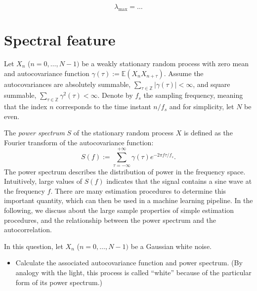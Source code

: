 \documentclass[11pt]{article}
\begin{document}
\begin{solution}  %

\begin{equation}
    \lambda_{\max} = \dots
\end{equation}

\end{solution}

\section{Spectral feature}

Let $X_n$ ($n=0,\dots,N-1)$ be a weakly stationary random process with zero mean and autocovariance function $\gamma(\tau):= \mathbb{E}(X_n X_{n+\tau})$.
Assume the autocovariances are absolutely summable, \ie $\sum_{\tau\in\mathbb{Z}} |\gamma(\tau)| < \infty$, and square summable, \ie $\sum_{\tau\in\mathbb{Z}} \gamma^2(\tau) < \infty$.
Denote by $f_s$ the sampling frequency, meaning that the index $n$ corresponds to the time instant $n / f_s$ and for simplicity, let $N$ be even.


The \textit{power spectrum} $S$ of the stationary random process $X$ is defined as the Fourier transform of the autocovariance function:
\begin{equation}
    S(f) := \sum_{\tau=-\infty}^{+\infty}\gamma(\tau)e^{-2\pi f\tau/f_s}.
\end{equation}
The power spectrum describes the distribution of power in the frequency space. 
Intuitively, large values of $S(f)$ indicates that the signal contains a sine wave at the frequency $f$.
There are many estimation procedures to determine this important quantity, which can then be used in a machine learning pipeline.
In the following, we discuss about the large sample properties of simple estimation procedures, and the relationship between the power spectrum and the autocorrelation.


\begin{exercise}
In this question, let $X_n$ ($n=0,\dots,N-1)$ be a Gaussian white noise.

\begin{itemize}
    \item Calculate the associated autocovariance function and power spectrum. (By analogy with the light, this process is called ``white'' because of the particular form of its power spectrum.)
\end{itemize}

\end{exercise}
\end{document}
